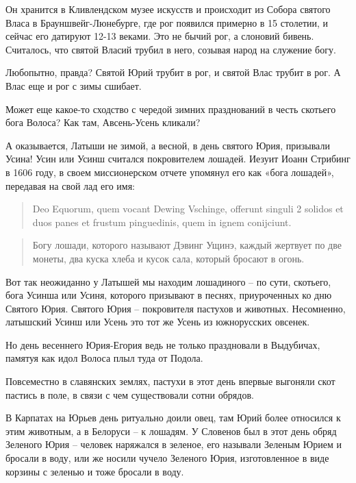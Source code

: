    
   Он хранится в Кливлендском музее искусств и происходит из Собора святого Власа в Брауншвейг-Люнебурге, где рог появился примерно в 15 столетии, и сейчас его датируют 12-13 веками. Это не бычий рог, а слоновий бивень. Считалось, что святой Власий трубил в него, созывая народ на служение богу.

   Любопытно, правда? Святой Юрий трубит в рог, и святой Влас трубит в рог. А Влас еще и рог с зимы сшибает.

   Может еще какое-то сходство с чередой зимних празднований в честь скотьего бога Волоса? Как там, Авсень-Усень кликали?

   А оказывается, Латыши не зимой, а весной, в день святого Юрия, призывали Усина! Усин или Усинш считался покровителем лошадей. Иезуит Иоанн Стрибинг в 1606 году, в своем миссионерском отчете упомянул его как «бога лошадей», передавая на свой лад его имя:

\begin{quotation}
\noindent Deo Equorum, quem vocant Dewing Vschinge, offerunt singuli 2 solidos et duos panes et frustum pinguedinis, quem in ignem conijciunt.\end{quotation}

\begin{quotation}
\noindent Богу лошади, которого называют Дэвинг Ущинэ, каждый жертвует по две монеты, два куска хлеба и кусок сала, который бросают в огонь.
\end{quotation}


   Вот так неожиданно у Латышей мы находим лошадиного – по сути, скотьего, бога Усинша или Усиня, которого призывают в песнях, приуроченных ко дню Святого Юрия. Святого Юрия – покровителя пастухов и животных. Несомненно, латышский Усинш или Усень это тот же Усень из южнорусских овсенек.

   Но день весеннего Юрия-Егория ведь не только праздновали в Выдубичах, памятуя как идол Волоса плыл туда от Подола. 

   Повсеместно в славянских землях, пастухи в этот день впервые выгоняли скот пастись в поле, в связи с чем существовали сотни обрядов.

   В Карпатах на Юрьев день ритуально доили овец, там Юрий более относился к этим животным, а в Белоруси – к лошадям. У Словенов был в этот день обряд Зеленого Юрия – человек наряжался в зеленое, его называли Зеленым Юрием и бросали в воду, или же носили чучело Зеленого Юрия, изготовленное в виде корзины с зеленью и тоже бросали в воду.

